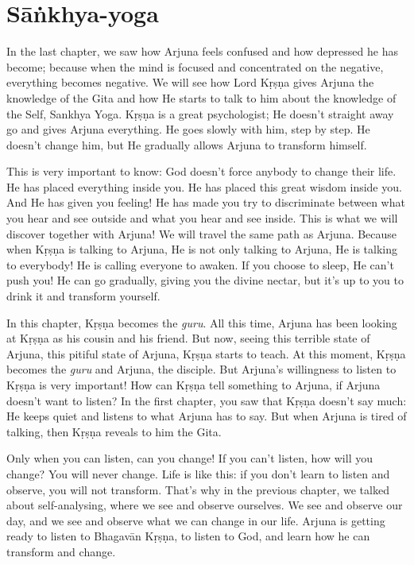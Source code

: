 \chapter{Sāṅkhya-yoga}

In the last chapter, we saw how Arjuna feels confused and how depressed he has become; because when the mind is focused and concentrated on the negative, everything becomes negative. We will see how Lord Kṛṣṇa gives Arjuna the knowledge of the Gita and how He starts to talk to him about the knowledge of the Self, Sankhya Yoga. Kṛṣṇa is a great psychologist; He doesn’t straight away go and gives Arjuna everything. He goes slowly with him, step by step. He doesn’t change him, but He gradually allows Arjuna to transform himself.

This is very important to know: God doesn’t force anybody to change their life. He has placed everything inside you. He has placed this great wisdom inside you. And He has given you feeling! He has made you try to discriminate between what you hear and see outside and what you hear and see inside. This is what we will discover together with Arjuna! We will travel the same path as Arjuna. Because when Kṛṣṇa is talking to Arjuna, He is not only talking to Arjuna, He is talking to everybody! He is calling everyone to awaken. If you choose to sleep, He can’t push you! He can go gradually, giving you the divine nectar, but it’s up to you to drink it and transform yourself.

In this chapter, Kṛṣṇa becomes the \textit{guru}. All this time, Arjuna has been looking at Kṛṣṇa as his cousin and his friend. But now, seeing this terrible state of Arjuna, this pitiful state of Arjuna, Kṛṣṇa starts to teach. At this moment, Kṛṣṇa becomes the \textit{guru} and Arjuna, the disciple. But Arjuna’s willingness to listen to Kṛṣṇa is very important! How can Kṛṣṇa tell something to Arjuna, if Arjuna doesn’t want to listen? In the first chapter, you saw that Kṛṣṇa doesn’t say much: He keeps quiet and listens to what Arjuna has to say. But when Arjuna is tired of talking, then Kṛṣṇa reveals to him the Gita.

Only when you can listen, can you change! If you can’t listen, how will you change? You will never change. Life is like this: if you don’t learn to listen and observe, you will not transform. That’s why in the previous chapter, we talked about self-analysing, where we see and observe ourselves. We see and observe our day, and we see and observe what we can change in our life. Arjuna is getting ready to listen to Bhagavān Kṛṣṇa, to listen to God, and learn how he can transform and change.

